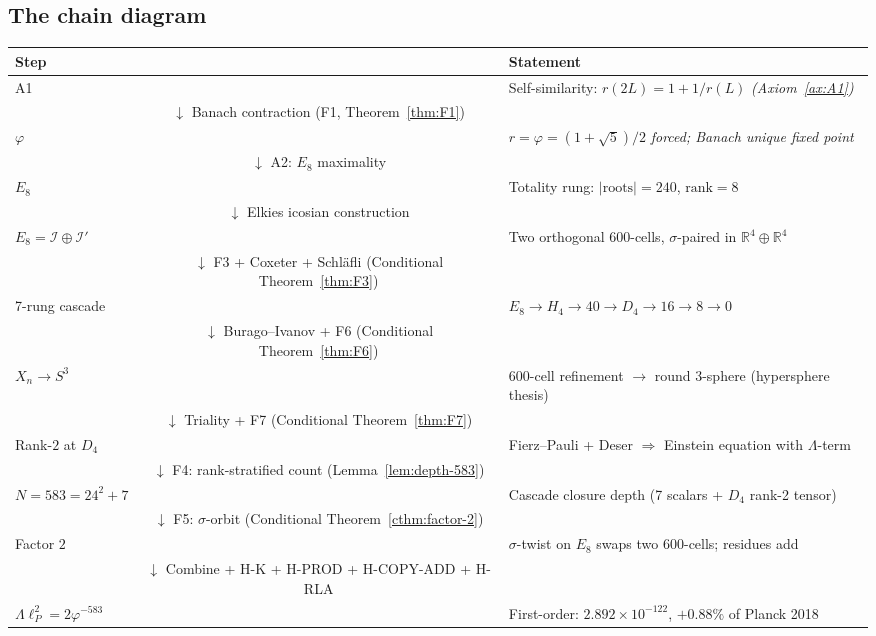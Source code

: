 \documentclass[11pt]{article}
\theoremstyle{plain}
\theoremstyle{definition}
\theoremstyle{remark}
\newcommand{\Ical}{\mathcal{I}}
\begin{document}
\subsection{The chain diagram}\label{app:chain-diagram}

\begin{center}
\renewcommand{\arraystretch}{1.25}
\begin{tabular}{lcl}
\textbf{Step} & & \textbf{Statement} \\
\midrule
A1 & & Self-similarity: $r(2L) = 1 + 1/r(L)$ \quad\textit{(Axiom~\ref{ax:A1})} \\
& $\downarrow$ Banach contraction (F1, Theorem~\ref{thm:F1}) & \\
$\varphi$ & & $r = \varphi = (1+\sqrt{5})/2$ \quad\textit{forced; Banach unique fixed point} \\
& $\downarrow$ A2: $E_8$ maximality & \\
$E_8$ & & Totality rung: $|\text{roots}| = 240$, $\mathrm{rank} = 8$ \\
& $\downarrow$ Elkies icosian construction & \\
$E_8 = \Ical \oplus \Ical'$ & & Two orthogonal 600-cells, $\sigma$-paired in $\mathbb{R}^4 \oplus \mathbb{R}^4$ \\
& $\downarrow$ F3 + Coxeter + Schl\"afli (Conditional Theorem~\ref{thm:F3}) & \\
7-rung cascade & & $E_8 \to H_4 \to 40 \to D_4 \to 16 \to 8 \to 0$ \\
& $\downarrow$ Burago--Ivanov + F6 (Conditional Theorem~\ref{thm:F6}) & \\
$X_n \to S^3$ & & 600-cell refinement $\to$ round 3-sphere (hypersphere thesis) \\
& $\downarrow$ Triality + F7 (Conditional Theorem~\ref{thm:F7}) & \\
Rank-$2$ at $D_4$ & & Fierz--Pauli + Deser $\Rightarrow$ Einstein equation with $\Lambda$-term \\
& $\downarrow$ F4: rank-stratified count (Lemma~\ref{lem:depth-583}) & \\
$N = 583 = 24^2 + 7$ & & Cascade closure depth (7 scalars + $D_4$ rank-2 tensor) \\
& $\downarrow$ F5: $\sigma$-orbit (Conditional Theorem~\ref{cthm:factor-2}) & \\
Factor $2$ & & $\sigma$-twist on $E_8$ swaps two 600-cells; residues add \\
& $\downarrow$ Combine + H-K + H-PROD + H-COPY-ADD + H-RLA & \\
$\boxed{\Lambda \ell_P^2 = 2\varphi^{-583}}$ & & First-order: $2.892 \times 10^{-122}$, $+0.88\%$ of Planck 2018 \\

\end{tabular}
\end{center}
\end{document}
